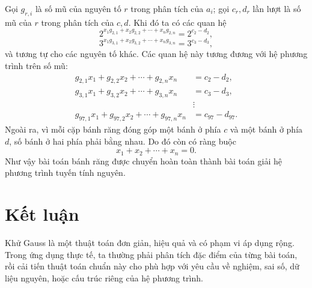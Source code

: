 \documentclass[11pt]{article}
\begin{document}
Gọi \(g_{r,i}\) là số mũ của nguyên tố \(r\) trong phân tích của \(a_i\);
gọi \(c_r,d_r\) lần lượt là số mũ của \(r\) trong phân tích của \(c,d\). Khi
đó ta có các quan hệ
\[
  2^{x_1g_{2,1}+x_2g_{2,2}+\cdots+x_ng_{2,n}}=2^{c_2-d_2},
\]
\[
  3^{x_1g_{3,1}+x_2g_{3,2}+\cdots+x_ng_{3,n}}=3^{c_3-d_3},
\]
và tương tự cho các nguyên tố khác. Các quan hệ này tương đương với hệ phương
trình trên số mũ:
\[
\begin{aligned}
  g_{2,1}x_1+g_{2,2}x_2+\cdots+g_{2,n}x_n &= c_2-d_2,\\
  g_{3,1}x_1+g_{3,2}x_2+\cdots+g_{3,n}x_n &= c_3-d_3,\\
  &\vdots\\
  g_{97,1}x_1+g_{97,2}x_2+\cdots+g_{97,n}x_n &= c_{97}-d_{97}.
\end{aligned}
\]
Ngoài ra, vì mỗi cặp bánh răng đóng góp một bánh ở phía \(c\) và một bánh ở
phía \(d\), số bánh ở hai phía phải bằng nhau. Do đó còn có ràng buộc
\[
  x_1+x_2+\cdots+x_n=0.
\]
Như vậy bài toán bánh răng được chuyển hoàn toàn thành bài toán giải hệ
phương trình tuyến tính nguyên.

\section{Kết luận}

Khử Gauss là một thuật toán đơn giản, hiệu quả và có phạm vi áp dụng rộng.
Trong ứng dụng thực tế, ta thường phải phân tích đặc điểm của từng bài toán,
rồi cải tiến thuật toán chuẩn này cho phù hợp với yêu cầu về nghiệm, sai số,
dữ liệu nguyên, hoặc cấu trúc riêng của hệ phương trình.
\end{document}
